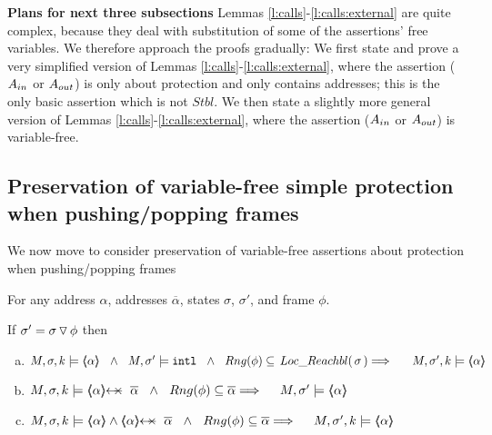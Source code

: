 
\vspace{1cm}

\textbf{Plans for next three subsections}
 Lemmas \ref{l:calls}-\ref{l:calls:external} are quite complex, because they deal with substitution of some of the assertions' free variables.
 We therefore approach the proofs gradually: 
 We  first state and prove a  very simplified version of   Lemmas \ref{l:calls}-\ref{l:calls:external}, where the assertion ($A_{in}$ or $A_{out}$)    is only about protection and only contains addresses; this is the only basic assertion which is not $Stbl$.
 We then state a slightly more general version of  Lemmas \ref{l:calls}-\ref{l:calls:external}, where the assertion ($A_{in}$ or $A_{out}$)  is variable-free.


\subsection{Preservation of variable-free simple protection when   pushing/popping frames}


 
We now move to consider preservation of variable-free assertions about protection when pushing/popping frames

\begin{lemma}
\label{l:aux:caller:called}

For any address $\alpha$, addresses $\overline \alpha$, states $\sigma$, $\sigma'$,  
and frame $\phi$.

\noindent
If   $\sigma'=\sigma  \, {\triangledown}\, \phi $  
\noindent
then

\begin{enumerate}[a.]
\label{l:aux:caller:called:one}
\item
$ \satDAssertFrom M  \sigma k    {\inside \alpha} \ \ \wedge \ \  
  M, \sigma' \models \intThis\ \ \wedge \ \  Rng(\phi) \subseteq  \LRelevantO \sigma
 \hfill \Longrightarrow  \ \ \  \   \ \satDAssertFrom M  {\sigma'} k   {\inside \alpha} $


\item
\label{l:aux:caller:called:two}
$\satDAssertFrom M  \sigma k    {\protectedFrom {\alpha} {\overline {\alpha}}}    \ \ \wedge \ \  Rng(\phi) \subseteq   {\overline \alpha}  
 \hfill \Longrightarrow  \ \ \  \    M,  {\sigma'} \models   {\inside \alpha}$

\item
\label{l:aux:caller:called:three}
$\satDAssertFrom M  \sigma k    {{\inside \alpha} \wedge  {\protectedFrom {\alpha} {\overline {\alpha}}}}    \ \ \wedge \ \  Rng(\phi) \subseteq    {\overline \alpha} 
 \hfill \Longrightarrow  \ \ \  \   \satDAssertFrom M  {\sigma'} k  {\inside \alpha}$

\end{enumerate}

\end{lemma}

